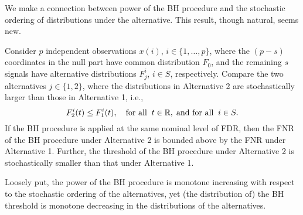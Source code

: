 
We make a connection between power of the \ac{BH} procedure and the stochastic ordering of distributions under the alternative.
This result, though natural, seems new. 

\begin{lemma} \label{lemma:monotonicity-BH-procedure}
Consider $p$ independent observations $x(i)$, $i\in\{1,\ldots,p\}$, where the $(p-s)$ coordinates in the null part have common distribution $F_0$, and the remaining $s$ signals have alternative distributions $F^{i}_j$, $i\in S$, respectively.
Compare the two alternatives $j\in\{1,2\}$, where the distributions in Alternative 2 are stochastically larger than those in Alternative 1, i.e.,
\begin{equation*}
    F^{i}_2(t) \le F^{i}_1(t), \quad \text{for all} \;\; t\in\mathbb R, \; \text{and for all} \;\; i\in S.
\end{equation*}
If the BH procedure is applied at the same nominal level of FDR, then the FNR of the \ac{BH} procedure under Alternative 2 is bounded above by the FNR under Alternative 1.
Further, the threshold of the \ac{BH} procedure under Alternative 2 is stochastically smaller than that under Alternative 1.
\end{lemma}

Loosely put, the power of the BH procedure is monotone increasing with respect to the stochastic ordering of the alternatives, yet (the distribution of) the \ac{BH} threshold is monotone decreasing in the distributions of the alternatives.

